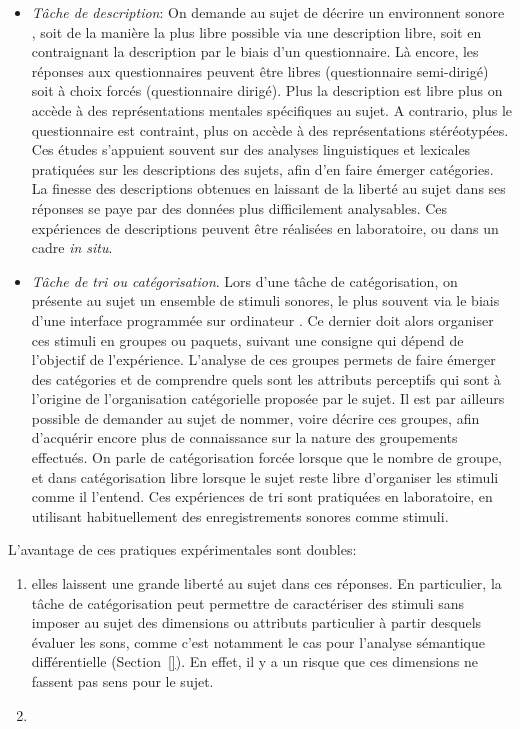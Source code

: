 \begin{itemize}
\item \emph{Tâche de description}: On demande au sujet de décrire un environnent sonore \citep{axelsson2005soundscape,raimbault2005urban,guastavino2006ideal,raimbault2006qualitative}, soit de la manière la plus libre possible via une description libre, soit en contraignant la description par le biais d'un questionnaire. Là encore, les réponses aux questionnaires peuvent être libres (questionnaire semi-dirigé) soit à choix forcés (questionnaire dirigé). Plus la description est libre plus on accède à des représentations mentales spécifiques au sujet. A contrario, plus le questionnaire est contraint, plus on accède à des représentations stéréotypées. Ces études s'appuient souvent sur des analyses linguistiques et lexicales pratiquées sur les descriptions des sujets, afin d'en faire émerger catégories. La finesse des descriptions obtenues en laissant de la liberté au sujet dans ses réponses se paye par des données plus difficilement analysables. Ces expériences de descriptions peuvent être réalisées en laboratoire, ou dans un cadre \emph{in situ}.
\item \emph{Tâche de tri ou catégorisation}. Lors d'une tâche de catégorisation, on présente au sujet un ensemble de stimuli sonores, le plus souvent via le biais d'une interface programmée sur ordinateur \citep{maffiolo_caracterisation_1999,guastavino2007categorization}. Ce dernier doit alors organiser ces stimuli en groupes ou paquets, suivant une consigne qui dépend de l'objectif de l’expérience. L'analyse de ces groupes permets de faire émerger des catégories et de comprendre quels sont les attributs perceptifs qui sont à l'origine de l'organisation catégorielle proposée par le sujet. Il est par ailleurs possible de demander au sujet de nommer, voire décrire ces groupes, afin d'acquérir encore plus de connaissance sur la nature des groupements effectués. On parle de catégorisation forcée lorsque que le nombre de groupe, et dans catégorisation libre lorsque le sujet reste libre d'organiser les stimuli comme il l'entend. Ces expériences de tri sont pratiquées en laboratoire, en utilisant habituellement des enregistrements sonores comme stimuli.
\end{itemize}

L'avantage de ces pratiques expérimentales sont doubles:

\begin{enumerate}
\item  elles laissent une grande liberté au sujet dans ces réponses. En particulier, la tâche de catégorisation peut permettre de caractériser des stimuli sans imposer au sujet des dimensions ou attributs particulier à partir desquels évaluer les sons, comme c'est notamment le cas pour l'analyse sémantique différentielle (\Cf Section~\ref{}). En effet, il y a un risque que ces dimensions ne fassent pas sens pour le sujet. 
\item {}
\end{enumerate}


